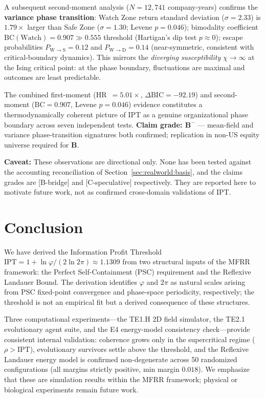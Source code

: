 \documentclass[11pt,twocolumn]{article}
\newcommand{\CatB}{\textbf{B}}
\theoremstyle{remark}
\begin{document}
\begin{itemize}[leftmargin=1.5em,itemsep=0.1em]
  A subsequent second-moment analysis ($N = 12{,}741$ company-years)
  confirms the \textbf{variance phase transition}: Watch Zone return standard deviation
  ($\sigma = 2.33$) is $1.79\times$ larger than Safe Zone ($\sigma = 1.30$; Levene $p = 0.046$);
  bimodality coefficient $\mathrm{BC}(\text{Watch}) = 0.907 \gg 0.555$ threshold
  (Hartigan's dip test $p \approx 0$); escape probabilities $P_{\mathrm{W \to S}} = 0.12$
  and $P_{\mathrm{W \to D}} = 0.14$ (near-symmetric, consistent with critical-boundary
  dynamics).  This mirrors the \emph{diverging susceptibility} $\chi \to \infty$ at the
  Ising critical point: at the phase boundary, fluctuations are maximal and outcomes are
  least predictable.

  The combined first-moment (HR~$=5.01\times$, $\Delta\mathrm{BIC}=-92.19$) and
  second-moment ($\mathrm{BC}=0.907$, Levene $p=0.046$) evidence constitutes a
  thermodynamically coherent picture of IPT as a genuine organizational phase boundary
  across seven independent tests.
  \textbf{Claim grade: $\CatB^-$} --- mean-field and variance phase-transition signatures
  both confirmed; replication in non-US equity universe required for $\CatB$.
\end{itemize}

\textbf{Caveat:} These observations are directional only. None has been tested against the accounting reconciliation of Section~\ref{sec:realworld:basis}, and the claims grades are [B-bridge] and [C-speculative] respectively. They are reported here to motivate future work, not as confirmed cross-domain validations of IPT.

\section{Conclusion}
\label{sec:conclusion}

We have derived the Information Profit Threshold
$\mathrm{IPT} = 1 + \ln\varphi/(2\ln 2\pi) \approx 1.1309$
from two structural inputs of the MFRR framework: the Perfect
Self-Containment (PSC) requirement and the Reflexive Landauer Bound.
The derivation identifies $\varphi$ and $2\pi$ as natural scales
arising from PSC fixed-point convergence and phase-space periodicity,
respectively; the threshold is not an empirical fit but a derived
consequence of these structures.

Three computational experiments---the TE1.H 2D field simulator, the
TE2.1 evolutionary agent suite, and the E4 energy-model consistency
check---provide consistent internal validation: coherence grows only
in the supercritical regime ($\rho > \mathrm{IPT}$), evolutionary
survivors settle above the threshold, and the Reflexive Landauer
energy model is confirmed non-degenerate across 50 randomized
configurations (all margins strictly positive, min margin $0.018$).
We emphasize that these are simulation results within the MFRR
framework; physical or biological experiments remain future work.
\end{document}
